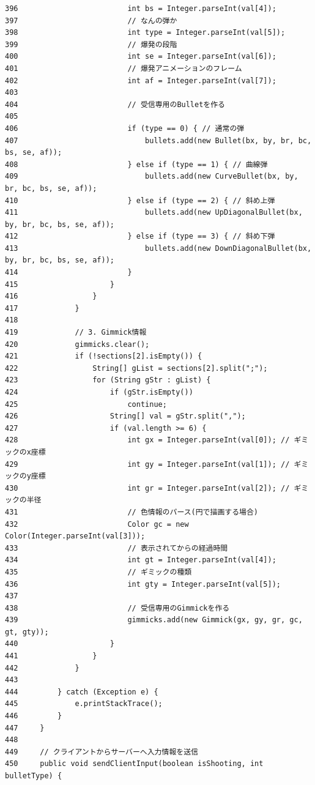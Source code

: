 \documentclass[11pt,a4j]{jarticle}
\begin{document}
\begin{small}
\begin{verbatim}
396                         int bs = Integer.parseInt(val[4]);
397                         // なんの弾か
398                         int type = Integer.parseInt(val[5]);
399                         // 爆発の段階
400                         int se = Integer.parseInt(val[6]);
401                         // 爆発アニメーションのフレーム
402                         int af = Integer.parseInt(val[7]);
403 
404                         // 受信専用のBulletを作る
405 
406                         if (type == 0) { // 通常の弾
407                             bullets.add(new Bullet(bx, by, br, bc, bs, se, af));
408                         } else if (type == 1) { // 曲線弾
409                             bullets.add(new CurveBullet(bx, by, br, bc, bs, se, af));
410                         } else if (type == 2) { // 斜め上弾
411                             bullets.add(new UpDiagonalBullet(bx, by, br, bc, bs, se, af));
412                         } else if (type == 3) { // 斜め下弾
413                             bullets.add(new DownDiagonalBullet(bx, by, br, bc, bs, se, af));
414                         }
415                     }
416                 }
417             }
418 
419             // 3. Gimmick情報
420             gimmicks.clear();
421             if (!sections[2].isEmpty()) {
422                 String[] gList = sections[2].split(";");
423                 for (String gStr : gList) {
424                     if (gStr.isEmpty())
425                         continue;
426                     String[] val = gStr.split(",");
427                     if (val.length >= 6) {
428                         int gx = Integer.parseInt(val[0]); // ギミックのx座標
429                         int gy = Integer.parseInt(val[1]); // ギミックのy座標
430                         int gr = Integer.parseInt(val[2]); // ギミックの半径
431                         // 色情報のパース(円で描画する場合)
432                         Color gc = new Color(Integer.parseInt(val[3]));
433                         // 表示されてからの経過時間
434                         int gt = Integer.parseInt(val[4]);
435                         // ギミックの種類
436                         int gty = Integer.parseInt(val[5]);
437 
438                         // 受信専用のGimmickを作る
439                         gimmicks.add(new Gimmick(gx, gy, gr, gc, gt, gty));
440                     }
441                 }
442             }
443 
444         } catch (Exception e) {
445             e.printStackTrace();
446         }
447     }
448 
449     // クライアントからサーバーへ入力情報を送信
450     public void sendClientInput(boolean isShooting, int bulletType) {

\end{verbatim}
\end{small}
\end{document}
